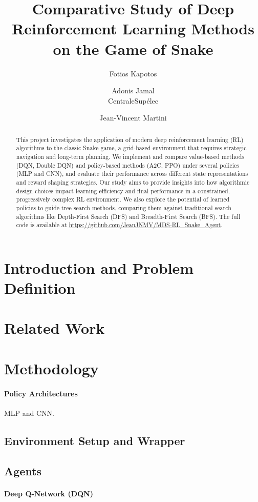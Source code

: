 \documentclass[10pt,twocolumn,letterpaper]{article}
\title{Comparative Study of Deep Reinforcement Learning Methods on the Game of Snake}
\author{
Fotios Kapotos\\
\and
Adonis Jamal\\
CentraleSup\'elec\\
\and
Jean-Vincent Martini\\
}
\begin{document}
\maketitle
\begin{abstract}
    This project investigates the application of modern deep reinforcement learning (RL) algorithms to the classic Snake game, a grid-based environment that requires strategic navigation and long-term planning. We implement and compare value-based methods (DQN, Double DQN) and policy-based methods (A2C, PPO) under several policies (MLP and CNN), and evaluate their performance across different state representations and reward shaping strategies. Our study aims to provide insights into how algorithmic design choices impact learning efficiency and final performance in a constrained, progressively complex RL environment. We also explore the potential of learned policies to guide tree search methods, comparing them against traditional search algorithms like Depth-First Search (DFS) and Breadth-First Search (BFS). The full code is available at \url{https://github.com/JeanJNMV/MDS-RL_Snake_Agent}.
\end{abstract}

\section{Introduction and Problem Definition}

\section{Related Work}

\section{Methodology}
\paragraph{Policy Architectures} MLP and CNN.

\subsection{Environment Setup and Wrapper}
\subsection{Agents}
\paragraph{Deep Q-Network (DQN)}
\end{document}
